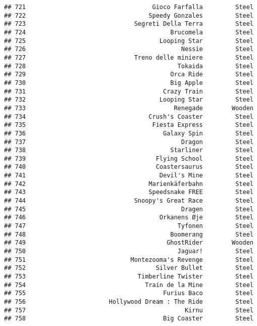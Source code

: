 \documentclass[
]{article}
\begin{document}
\begin{verbatim}
## 721                                   Gioco Farfalla         Steel
## 722                                  Speedy Gonzales         Steel
## 723                              Segreti Della Terra         Steel
## 724                                        Brucomela         Steel
## 725                                     Looping Star         Steel
## 726                                           Nessie         Steel
## 727                              Treno delle miniere         Steel
## 728                                          Tokaida         Steel
## 729                                        Orca Ride         Steel
## 730                                        Big Apple         Steel
## 731                                      Crazy Train         Steel
## 732                                     Looping Star         Steel
## 733                                         Renegade        Wooden
## 734                                  Crush's Coaster         Steel
## 735                                   Fiesta Express         Steel
## 736                                      Galaxy Spin         Steel
## 737                                           Dragon         Steel
## 738                                        Starliner         Steel
## 739                                    Flying School         Steel
## 740                                    Coastersaurus         Steel
## 741                                     Devil's Mine         Steel
## 742                                  Marienkäferbahn         Steel
## 743                                  Speedsnake FREE         Steel
## 744                              Snoopy's Great Race         Steel
## 745                                           Dragen         Steel
## 746                                     Orkanens Øje         Steel
## 747                                          Tyfonen         Steel
## 748                                        Boomerang         Steel
## 749                                       GhostRider        Wooden
## 750                                          Jaguar!         Steel
## 751                             Montezooma's Revenge         Steel
## 752                                    Silver Bullet         Steel
## 753                               Timberline Twister         Steel
## 754                                 Train de la Mine         Steel
## 755                                      Furius Baco         Steel
## 756                       Hollywood Dream : The Ride         Steel
## 757                                            Kirnu         Steel
## 758                                      Big Coaster         Steel

\end{verbatim}
\end{document}

